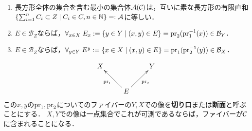 \documentclass[uplatex, dvipdfmx]{jsreport}
\renewcommand{\B}{\mathcal{B}}
\begin{document}
\begin{lemma}[矩形集合の有限直和は集合体]\mbox{}\label{lemma-finite-sum-of-rectangles}
    \begin{enumerate}
        \item 長方形全体の集合を含む最小の集合体$\mathcal{A}(\mathcal{C})$は，互いに素な長方形の有限直和$\left\{\sum_{i=1}^nC_i\subset Z\;\middle|\;C_i\in C,n\in\mathbb{N}\right\}=:\mathcal{A}$に等しい．
        \item $E\in\B_Z$ならば，$\forall_{x\in X}\;E_x:=\{y\in Y\mid (x,y)\in E\}=\pr_2(\pr_1^{-1}(x))\in\B_Y$．
        \item $E\in\B_Z$ならば，$\forall_{y\in Y}\;E^y:=\{x\in X\mid (x,y)\in E\}=\pr_1(\pr_2^{-1}(y))\in\B_X$．
    \end{enumerate}
    \[\xymatrix{
        X&&Y\\
        &E\ar[ul]^-{\pr_1}\ar[ur]_-{\pr_2}
    }\]
    この$x,y$の$\mathrm{pr}_1,\mathrm{pr}_2$についてのファイバーの$Y,X$での像を\textbf{切り口}または\textbf{断面}と呼ぶことにする．
    $X,Y$での像は一点集合でこれが可測であるならば，ファイバーが$\mathcal{C}$に含まれることになる．
\end{lemma}
\end{document}
